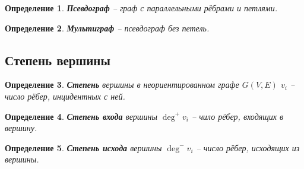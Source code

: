 \documentclass[a4paper,12pt]{article}
\newtheorem*{defin}{Определение}
\begin{document}
\begin{defin}
    \textbf{Псевдограф} -- граф с параллельными рёбрами и петлями.
\end{defin}

\begin{defin}
    \textbf{Мультиграф} -- псевдограф без петель.
\end{defin}

\subsection*{Степень вершины}

\begin{defin}
    \textbf{Степень} вершины в неориентированном графе $G(V, E)$ $v_i$ -- число рёбер, инцидентных с ней.
\end{defin}

\begin{defin}
    \textbf{Степень входа} вершины $\deg^+ v_i$ -- чило рёбер, входящих в вершину.
\end{defin}

\begin{defin}
    \textbf{Степень исхода} вершины $\deg^- v_i$ -- число рёбер, исходящих из вершины.
\end{defin}
\end{document}

